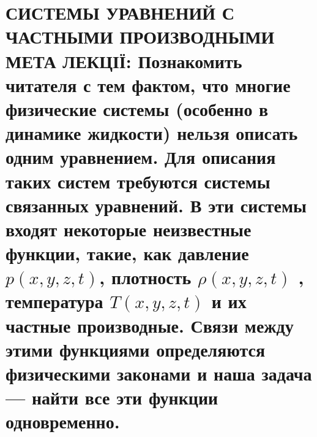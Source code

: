 \documentclass[
  ukrainian,
]{article}
\begin{document}
\section{\texorpdfstring{СИСТЕМЫ УРАВНЕНИЙ С ЧАСТНЫМИ ПРОИЗВОДНЫМИ МЕТА
ЛЕКЦІЇ: Познакомить читателя с тем фактом, что многие физические системы
(особенно в динамике жидкости) нельзя описать одним уравнением. Для
описания таких систем требуются системы связанных уравнений. В эти
системы входят некоторые неизвестные функции, такие, как давление
\(p(x, y, z, t)\), плотность \(\rho(x, y, z, t)\) , температура
\(T(x, y, z, t)\) и их частные производные. Связи между этими функциями
определяются физическими законами и наша задача --- найти все эти
функции
одновременно.}{СИСТЕМЫ УРАВНЕНИЙ С ЧАСТНЫМИ ПРОИЗВОДНЫМИ МЕТА ЛЕКЦІЇ: Познакомить читателя с тем фактом, что многие физические системы (особенно в динамике жидкости) нельзя описать одним уравнением. Для описания таких систем требуются системы связанных уравнений. В эти системы входят некоторые неизвестные функции, такие, как давление p(x, y, z, t), плотность \textbackslash rho(x, y, z, t) , температура T(x, y, z, t) и их частные производные. Связи между этими функциями определяются физическими законами и наша задача --- найти все эти функции }}
\end{document}
